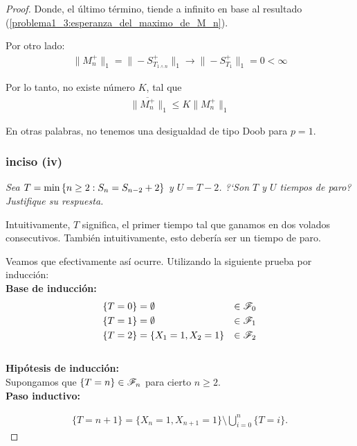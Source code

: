 \begin{proof}
		Donde, el último término, tiende a infinito en base al resultado 
		(\ref{problema1_3:esperanza_del_maximo_de_M_n}).

		Por otro lado:
		\begin{align}
			\|M_n^+\|_1=\|-S_{T_{1\wedge n}}^{+}\|_1  \longrightarrow  \|-S_{T_1}^+\|_1 = 0 < \infty
		\end{align}
		
		Por lo tanto, no existe número $K$, tal que
		\begin{align}
			 \|\overline{M_n^+}\|_1 \leq  K \|M_n^+\|_1
		\end{align}
		
		En otras palabras, no tenemos una desigualdad de tipo Doob para $p=1$.\\
		
	\subsubsection{inciso (iv)}
	\emph
	{
		Sea $T=\min\left\{ n\geq 2:S_n=S_{n-2} + 2\right\} $ y $U=T-2$. ?`Son $T$ y $U$ 
		tiempos de paro? Justifique su respuesta.\\
	}
	
		Intuitivamente, $T$ significa, el primer tiempo tal que ganamos en dos volados consecutivos.
		También intuitivamente, esto debería ser un tiempo de paro.
		
		Veamos que efectivamente así ocurre. Utilizando la siguiente prueba por inducción:\\
		
		\textbf{Base de inducción:}		
			\begin{align}
				\{T = 0\} 		&= \emptyset  				& 	\in \mathscr{F}_0 \\
				\{T = 1\} 		&= \emptyset  				& 	\in \mathscr{F}_1 \\
				\{T = 2\} 		&= \{ X_1 = 1, X_2 = 1\} 	&	\in \mathscr{F}_2
			\end{align}	\\					
		
		\textbf{Hipótesis de inducción:}\\
		
			Supongamos que $\{T = n\} \in \mathscr{F}_n$ para cierto $n \geq 2$.\\
			
		\textbf{Paso inductivo:}
			
			\begin{align}
				\{T = n + 1 \} = \{ X_n = 1, X_{n+1} = 1\} \setminus \bigcup_{i=0}^{n} \{T = i\}.
			\end{align}				
		

\end{proof}
